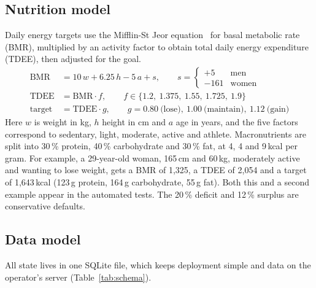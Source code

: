\documentclass[11pt,a4paper]{article}
\begin{document}
\subsection{Nutrition model}\label{sec:nutrition}

Daily energy targets use the Mifflin-St Jeor equation~\cite{mifflin1990} for basal metabolic rate
(BMR), multiplied by an activity factor to obtain total daily energy expenditure (TDEE), then adjusted
for the goal.
\begin{align}
\mathrm{BMR} &= 10\,w + 6.25\,h - 5\,a + s, \qquad s = \begin{cases}+5 & \text{men}\\ -161 & \text{women}\end{cases}\\
\mathrm{TDEE} &= \mathrm{BMR}\cdot f, \qquad f \in \{1.2,\ 1.375,\ 1.55,\ 1.725,\ 1.9\}\\
\mathrm{target} &= \mathrm{TDEE}\cdot g, \qquad g = 0.80\ \text{(lose)},\ 1.00\ \text{(maintain)},\ 1.12\ \text{(gain)}
\end{align}
Here $w$ is weight in kg, $h$ height in cm and $a$ age in years, and the five factors correspond to
sedentary, light, moderate, active and athlete. Macronutrients are split into 30\,\% protein, 40\,\%
carbohydrate and 30\,\% fat, at 4, 4 and 9\,kcal per gram. For example, a 29-year-old woman, 165\,cm and
60\,kg, moderately active and wanting to lose weight, gets a BMR of 1{,}325, a TDEE of 2{,}054 and a
target of 1{,}643\,kcal (123\,g protein, 164\,g carbohydrate, 55\,g fat). Both this and a second example
appear in the automated tests. The 20\,\% deficit and 12\,\% surplus are conservative defaults.

\subsection{Data model}

All state lives in one SQLite file, which keeps deployment simple and data on the operator's server
(Table~\ref{tab:schema}).
\end{document}
